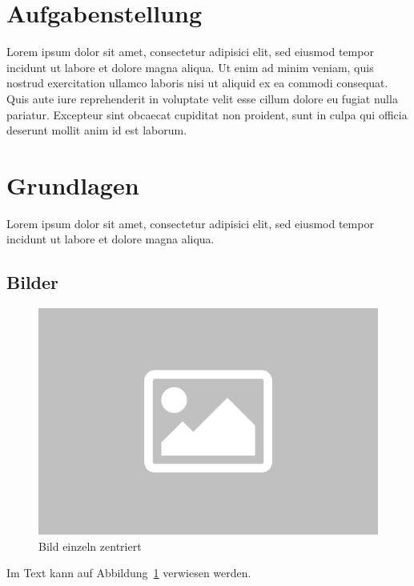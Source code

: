 \section{Aufgabenstellung}
	Lorem ipsum dolor sit amet, consectetur adipisici elit, sed eiusmod tempor incidunt ut labore et dolore magna aliqua. Ut enim ad minim veniam, quis nostrud exercitation ullamco laboris nisi ut aliquid ex ea commodi consequat. Quis aute iure reprehenderit in voluptate velit esse cillum dolore eu fugiat nulla pariatur. Excepteur sint obcaecat cupiditat non proident, sunt in culpa qui officia deserunt mollit anim id est laborum. 
			

\section{Grundlagen}
	Lorem ipsum dolor sit amet, consectetur adipisici elit, sed eiusmod tempor incidunt ut labore et dolore magna aliqua.

\subsection{Bilder}

	\begin{figure}[H]
		\centering
		\includegraphics[scale=0.2]{pictures/platzhalter_bild.png}
		\caption{Bild einzeln zentriert}
		\label{fig:platzhalter_bild}
	\end{figure}

	Im Text kann auf Abbildung~\ref{fig:platzhalter_bild} verwiesen werden.
	
